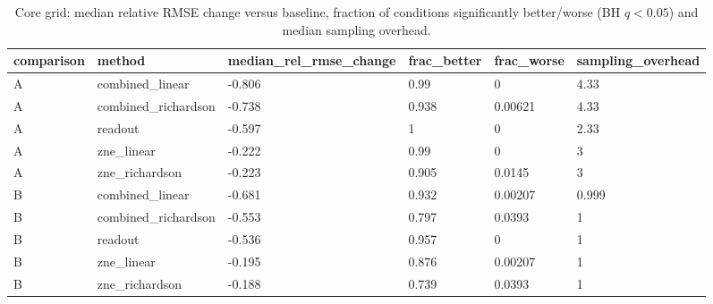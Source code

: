 \begin{table}[t]
\centering
\small
\caption{Core grid: median relative RMSE change versus baseline, fraction of conditions significantly better/worse (BH $q<0.05$) and median sampling overhead.}
\label{tab:core}
\begin{tabular}{llllll}
\toprule
comparison & method & median\_rel\_rmse\_change & frac\_better & frac\_worse & sampling\_overhead \\
\midrule
A & combined\_linear & -0.806 & 0.99 & 0 & 4.33 \\
A & combined\_richardson & -0.738 & 0.938 & 0.00621 & 4.33 \\
A & readout & -0.597 & 1 & 0 & 2.33 \\
A & zne\_linear & -0.222 & 0.99 & 0 & 3 \\
A & zne\_richardson & -0.223 & 0.905 & 0.0145 & 3 \\
B & combined\_linear & -0.681 & 0.932 & 0.00207 & 0.999 \\
B & combined\_richardson & -0.553 & 0.797 & 0.0393 & 1 \\
B & readout & -0.536 & 0.957 & 0 & 1 \\
B & zne\_linear & -0.195 & 0.876 & 0.00207 & 1 \\
B & zne\_richardson & -0.188 & 0.739 & 0.0393 & 1 \\
\bottomrule
\end{tabular}
\end{table}
